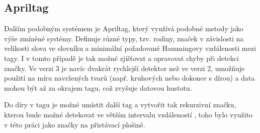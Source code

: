     \subsection{Apriltag}
      Dalším podobným systémem je Apriltag, který využívá podobné metody jako výše zmíněné systémy. Definuje různé typy, tzv. rodiny, značek v závislosti na velikosti slova ve slovníku a minimální požadované Hammingovy vzdálenosti mezi tagy. I v tomto případě je tak možné zjišťovat a opravovat chyby při detekci značky. \cite{apriltag2} Ve verzi 3 je navíc dvakrát rychlejší detektor než ve verzi 2, umožňuje použití na míru navržených tvarů (např. kruhových nebo dokonce s dírou) a data mohou být až za okrajem tagu, což zvyšuje datovou hustotu. \cite{apriltag3}

      Do díry v tagu je možné umístit další tag a vytvořit tak rekurzivní značku, kterou bude možné detekovat ve větším intervalu vzdáleností \cite{apriltag3}, toho bylo využito v této práci jako značky na přistávací plošině.